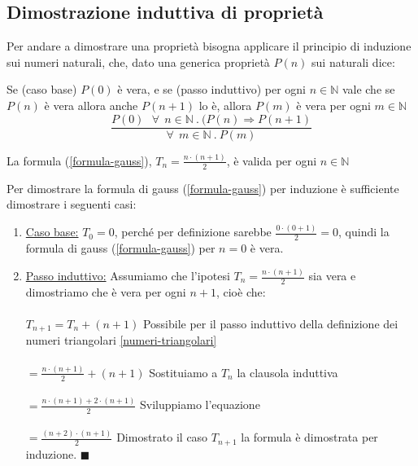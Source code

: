 \subsection{Dimostrazione induttiva di proprietà}
Per andare a dimostrare una proprietà bisogna applicare il principio di induzione sui numeri naturali, che, dato una generica proprietà $P(n)$ sui naturali dice:
\begin{definition}
    Se (caso base) $P(0)$ è vera, e se (passo induttivo) per ogni $n \in \mathbb{N}$ vale che se $P(n)$ è vera allora anche $P(n+1)$ lo è, allora $P(m)$ è vera per ogni $m \in \mathbb{N}$
    \begin{equation}
        \frac{P(0) \: \: \: \forall \: \: n \in \mathbb{N}\:.\:(P(n) \Longrightarrow P(n+1)}{\forall \: \: m \in \mathbb{N}\:.\:P(m)}
    \end{equation}
\end{definition}
\begin{proposition}
La formula (\ref{formula-gauss}), $T_n = \frac{n \cdot (n + 1)}{2}$, è valida per ogni $n \in \mathbb{N}$
\end{proposition}
\begin{demostration}
Per dimostrare la formula di gauss (\ref{formula-gauss}) per induzione è sufficiente dimostrare i seguenti casi:
\begin{enumerate}
    \item \underline{Caso base:} $T_0 = 0$, perché per definizione sarebbe $\frac{0 \cdot (0 + 1)}{2} = 0$, quindi la formula di gauss (\ref{formula-gauss}) per $n = 0$ è vera.
    \item \underline{Passo induttivo:} Assumiamo che l'ipotesi $T_n = \frac{n \cdot (n + 1)}{2}$ sia vera e dimostriamo che è vera per ogni $n + 1$, cioè che:\\\\
    $T_{n+1} = T_n + (n + 1)$ \hspace{.5cm} Possibile per il passo induttivo della definizione dei numeri triangolari \ref{numeri-triangolari} \\\\
    $= \frac{n \cdot (n + 1)}{2} + (n + 1)$ \hspace{.5cm} Sostituiamo a $T_n$ la clausola induttiva\\\\
    $= \frac{n \cdot (n + 1) + 2 \cdot (n + 1)}{2}$ \hspace{.5cm} Sviluppiamo l'equazione\\\\
    $= \frac{(n + 2) \cdot (n + 1)}{2}$  \hspace{.5cm} Dimostrato il caso $T_{n+1}$ la formula è dimostrata per induzione. \: \: $\blacksquare$
\end{enumerate}
\end{demostration}
